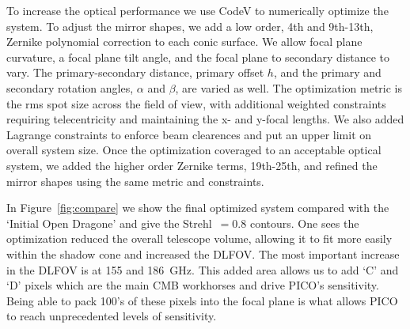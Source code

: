 \documentclass[]{spie}  %
\newcommand{\comr}[1]{\textcolor{red}{#1}}
\begin{document}
To increase the optical performance we use CodeV to numerically optimize the system.  To adjust the mirror shapes, we add a low order, 
4th and 9th-13th, Zernike polynomial correction to each conic surface.  We allow focal plane curvature, a focal plane tilt angle, 
and the focal plane to secondary distance to vary.  The primary-secondary distance, primary offset $h$, and the primary and secondary 
rotation angles, $\alpha$ and $\beta$, are varied as well. The optimization metric is the rms spot size across the field of view, with 
additional weighted constraints requiring telecentricity and maintaining the x- and y-focal lengths.  We also added Lagrange constraints 
to enforce beam clearences and put an upper limit on overall system size.  Once the optimization coveraged to an acceptable optical 
system, we added the higher order Zernike terms, 19th-25th, and refined the mirror shapes using the same metric and constraints.


In Figure~\ref{fig:compare} we show the final optimized system compared with the `Initial Open Dragone' and give the Strehl~$=0.8$ contours.  One sees 
the optimization reduced the overall telescope volume, allowing it to fit more easily within the shadow cone and increased the DLFOV.  The most important increase in the DLFOV is
at 155 and 186~GHz.  This added area allows us to add `C' and `D' pixels which are the main CMB workhorses and 
drive PICO's sensitivity. Being able to pack 100's of these pixels into the focal plane is what allows PICO to reach unprecedented levels of sensitivity.
\end{document}
